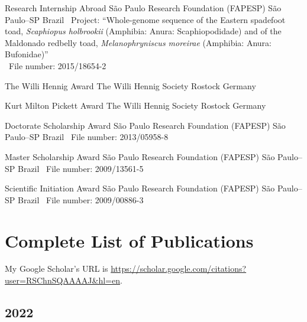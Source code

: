 \documentclass[11pt, letterpaper, sans]{moderncv}
\begin{document}
	{Research Internship Abroad}
	{São Paulo Research Foundation (FAPESP)}
	{São Paulo--SP}
	{Brazil}
	{
		\textbullet~Project: ``Whole-genome sequence of the Eastern spadefoot toad, \textit{Scaphiopus holbrookii} (Amphibia: Anura: Scaphiopodidade) and of the Maldonado redbelly toad, \textit{Melanophryniscus moreirae} (Amphibia: Anura: Bufonidae)''\\
		\textbullet~File number: 2015/18654-2
	}

	{The Willi Hennig Award}
	{The Willi Hennig Society}
	{Rostock}
	{Germany}
	{}

\cventry{---}
	{Kurt Milton Pickett Award}
	{The Willi Hennig Society}
	{Rostock}
	{Germany}
	{}

	{Doctorate Scholarship Award}
	{São Paulo Research Foundation (FAPESP)}
	{São Paulo--SP}
	{Brazil}
	{
		\textbullet~File number: 2013/05958-8
	}

	{Master Scholarship Award}
	{São Paulo Research Foundation (FAPESP)}
	{São Paulo--SP}
	{Brazil}
	{
		\textbullet~File number: 2009/13561-5
	}

	{Scientific Initiation Award}
	{São Paulo Research Foundation (FAPESP)}
	{São Paulo--SP}
	{Brazil}
	{
		\textbullet~File number: 2009/00886-3
	}


\section{Complete List of Publications}

My Google Scholar's URL is \href{https://scholar.google.com/citations?user=RSChnSQAAAAJ\&hl=en}{https://scholar.google.com/citations?user=RSChnSQAAAAJ\&hl=en}.



\subsection{2022}
\end{document}
